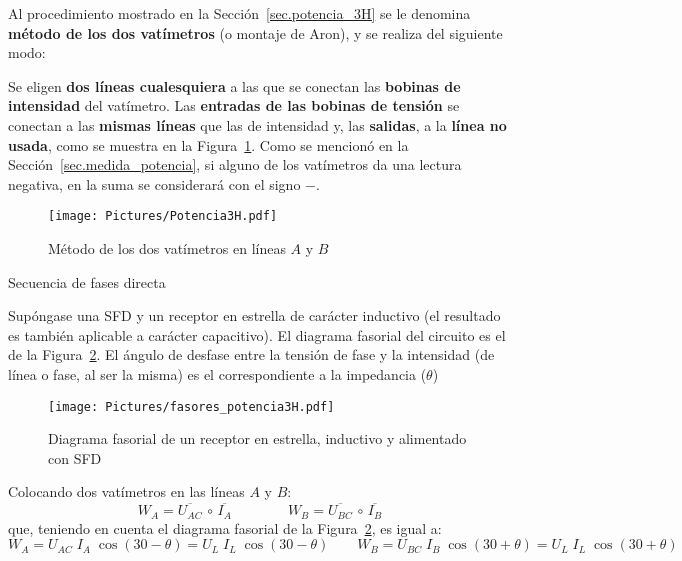 \documentclass[11pt]{book} %
\makeatletter
\numberwithin{dummy}{section}
\theoremstyle{ocrenumbox}
\theoremstyle{blacknumex}
\theoremstyle{blacknumbox}
\theoremstyle{ocrenum}
\renewcommand{\subsubsection}{\@startsection {subsubsection}{3}{\z@}
{-2ex \@plus -0.1ex \@minus -.2ex}
{.2ex \@plus.2ex }
{\normalfont\small\sffamily\bfseries}}
\newlength\esp
\makeatother
\begin{document}
	Al procedimiento mostrado en la Sección~\ref{sec.potencia_3H} se le denomina \textbf{método de los dos vatímetros} (o montaje de Aron), y se realiza del siguiente modo: 
	
	Se eligen \textbf{dos líneas cualesquiera} a las que se conectan las \textbf{bobinas de intensidad} del vatímetro. Las \textbf{entradas de las bobinas de tensión} se conectan a las \textbf{mismas líneas} que las de intensidad y, las \textbf{salidas}, a la \textbf{línea no usada}, como se muestra en la Figura~\ref{fig.potencia3H}. Como se mencionó en la Sección~\ref{sec.medida_potencia}, si alguno de los vatímetros da una lectura negativa, en la suma se considerará con el signo $-$.   
	\begin{figure}[htbp]
	    \centering
	    \texttt{[image: Pictures/Potencia3H.pdf]}
	    \caption{Método de los dos vatímetros en líneas $A$ y $B$}
	    \label{fig.potencia3H}
	\end{figure}
	
	\subsubsection{Secuencia de fases directa}
	
	Supóngase una SFD y un receptor en estrella de carácter inductivo (el resultado es también aplicable a carácter capacitivo). El diagrama fasorial del circuito es el de la Figura~\ref{fig.fasores_potencia3H}. El ángulo de desfase entre la tensión de fase y la intensidad (de línea o fase, al ser la misma) es el correspondiente a la impedancia ($\theta$)
	\begin{figure}[htbp]
	    \centering
	    \texttt{[image: Pictures/fasores\_potencia3H.pdf]}
	    \caption{Diagrama fasorial de un receptor en estrella, inductivo y alimentado con SFD}
	    \label{fig.fasores_potencia3H}
	\end{figure}
	
	Colocando dos vatímetros en las líneas $A$ y $B$:
	\begin{equation*}
	    W_A=\overline{U_{AC}}\,\circ\,\overline{I_A}\qquad\qquad W_B=\overline{U_{BC}}\,\circ\,\overline{I_B}
	\end{equation*}
	que, teniendo en cuenta el diagrama fasorial de la Figura~\ref{fig.fasores_potencia3H}, es igual a: 
	\begin{equation*}
	    W_A={U_{AC}}\; {I_A}\;\cos{(30-\theta)}=U_L\;I_L\;\cos{(30-\theta)}\qquad W_B={U_{BC}}\; {I_B}\;\cos{(30+\theta)}=U_L\;I_L\;\cos{(30+\theta)}
	\end{equation*}
	
\end{document}
